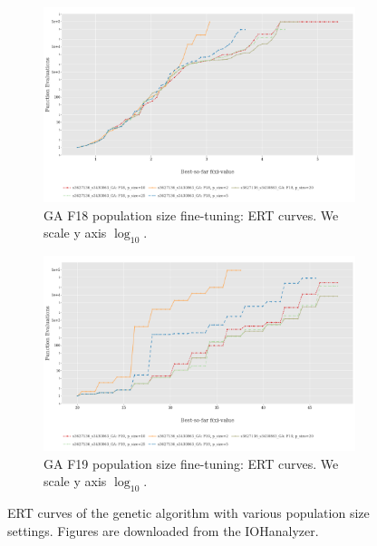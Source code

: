 \documentclass{article}
\begin{document}
\begin{figure}[!ht]
    \begin{subfigure}[h]{0.95\linewidth}
        \includegraphics[width=\linewidth]{ga/f18/psize_ert.png}
        \caption{GA F18 population size fine-tuning: ERT curves. We scale y axis $\log_{10}$.}
    \end{subfigure}
    \hfill
    \begin{subfigure}[h]{0.95\linewidth}
        \includegraphics[width=\linewidth]{ga/f19/psize_ert.png}
        \caption{GA F19 population size fine-tuning: ERT curves. We scale y axis $\log_{10}$.}
    \end{subfigure}
    \caption{ERT curves of the genetic algorithm with various population size settings. Figures are downloaded from the IOHanalyzer.}
    \label{fig:experi-ga-psize-ert}
\end{figure}
\end{document}
